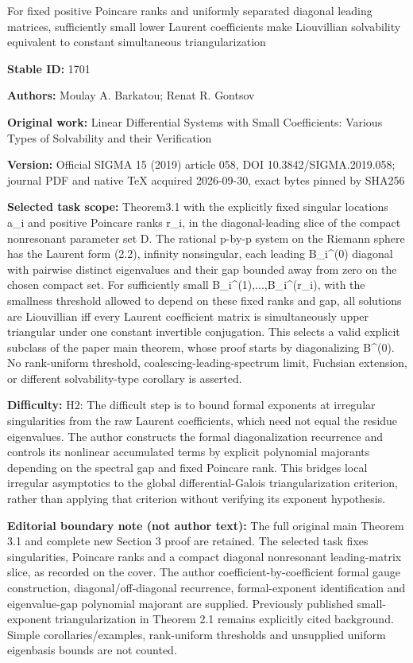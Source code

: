 \documentclass[11pt]{article}
\numberwithin{equation}{section}
\begin{document}
\begin{center}\Large For fixed positive Poincare ranks and uniformly separated diagonal leading matrices, sufficiently small lower Laurent coefficients make Liouvillian solvability equivalent to constant simultaneous triangularization\end{center}
\noindent\textbf{Stable ID:} 1701\par
\noindent\textbf{Authors:} Moulay A. Barkatou; Renat R. Gontsov\par
\noindent\textbf{Original work:} Linear Differential Systems with Small Coefficients: Various Types of Solvability and their Verification\par
\noindent\textbf{Version:} Official SIGMA 15 (2019) article 058, DOI 10.3842/SIGMA.2019.058; journal PDF and native TeX acquired 2026-09-30, exact bytes pinned by SHA256\par
\noindent\textbf{Selected task scope:} Theorem3.1 with the explicitly fixed singular locations a\_i and positive Poincare ranks r\_i, in the diagonal-leading slice of the compact nonresonant parameter set D. The rational p-by-p system on the Riemann sphere has the Laurent form (2.2), infinity nonsingular, each leading B\_i\textasciicircum{}(0) diagonal with pairwise distinct eigenvalues and their gap bounded away from zero on the chosen compact set. For sufficiently small B\_i\textasciicircum{}(1),...,B\_i\textasciicircum{}(r\_i), with the smallness threshold allowed to depend on these fixed ranks and gap, all solutions are Liouvillian iff every Laurent coefficient matrix is simultaneously upper triangular under one constant invertible conjugation. This selects a valid explicit subclass of the paper main theorem, whose proof starts by diagonalizing B\textasciicircum{}(0). No rank-uniform threshold, coalescing-leading-spectrum limit, Fuchsian extension, or different solvability-type corollary is asserted.\par
\noindent\textbf{Difficulty:} H2: The difficult step is to bound formal exponents at irregular singularities from the raw Laurent coefficients, which need not equal the residue eigenvalues. The author constructs the formal diagonalization recurrence and controls its nonlinear accumulated terms by explicit polynomial majorants depending on the spectral gap and fixed Poincare rank. This bridges local irregular asymptotics to the global differential-Galois triangularization criterion, rather than applying that criterion without verifying its exponent hypothesis.\par
\noindent\textbf{Editorial boundary note (not author text):} The full original main Theorem 3.1 and complete new Section 3 proof are retained. The selected task fixes singularities, Poincare ranks and a compact diagonal nonresonant leading-matrix slice, as recorded on the cover. The author coefficient-by-coefficient formal gauge construction, diagonal/off-diagonal recurrence, formal-exponent identification and eigenvalue-gap polynomial majorant are supplied. Previously published small-exponent triangularization in Theorem 2.1 remains explicitly cited background. Simple corollaries/examples, rank-uniform thresholds and unsupplied uniform eigenbasis bounds are not counted.\par
\end{document}
